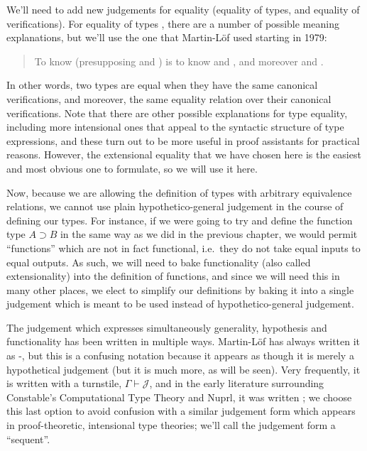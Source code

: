 \documentclass[main.tex]{subfiles}
\begin{document}
We'll need to add new judgements for equality (equality of types, and equality
of verifications). For equality of types , there are a
number of possible meaning explanations, but we'll use the one that
Martin-L\"of used starting in 1979:

\begin{quote}
  To know  (presupposing  and ) is to know
 and
, and moreover
 and
.
\end{quote}

In other words, two types are equal when they have the same canonical
verifications, and moreover, the same equality relation over their canonical
verifications. Note that there are other possible explanations for type
equality, including more intensional ones that appeal to the syntactic
structure of type expressions, and these turn out to be more useful in proof
assistants for practical reasons. However, the extensional equality that we
have chosen here is the easiest and most obvious one to formulate, so we will
use it here.

Now, because we are allowing the definition of types with arbitrary equivalence
relations, we cannot use plain hypothetico-general judgement in the course of
defining our types. For instance, if we were going to try and define the
function type $A\supset B$ in the same way as we did in the previous chapter,
we would permit ``functions'' which are not in fact functional, i.e.\ they do
not take equal inputs to equal outputs. As such, we will need to bake
functionality (also called extensionality) into the definition of functions,
and since we will need this in many other places, we elect to simplify our
definitions by baking it into a single judgement which is meant to be used
instead of hypothetico-general judgement.

The judgement which expresses simultaneously generality, hypothesis and
functionality has been written in multiple ways. Martin-L\"of has always
written it as \hyp{}{\Gamma}, but this is a confusing notation
because it appears as though it is merely a hypothetical judgement (but it is
much more, as will be seen). Very frequently, it is written with a turnstile,
$\Gamma\vdash\mathcal{J}$, and in the early literature surrounding Constable's
Computational Type Theory and Nuprl, it was written
; we choose this last option to avoid
confusion with a similar judgement form which appears in proof-theoretic,
intensional type theories; we'll call the judgement form a ``sequent''.
\end{document}
